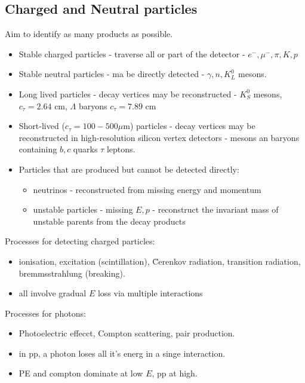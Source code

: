 \documentclass[]{article}
\begin{document}
	\subsection{Charged and Neutral particles}
	
		Aim to identify as many products as possible.
		
		\begin{itemize}
			\item Stable charged particles - traverse all or part of the detector - $e^-, \mu^-, \pi, K, p$
			\item Stable neutral particles - ma be directly detected - $\gamma, n, K^0_L$ mesons.
			\item Long lived particles - decay vertices may be reconstructed - $K^0_S$ mesons, $c_\tau=2.64$ cm, $\Lambda$ baryons $c_\tau=7.89$ cm
			\item Short-lived ($c_\tau=100-500\mu$m) particles - decay vertices may be reconstructed in high-resolution silicon vertex detectors - mesons an baryons containing $b, c$ quarks $\tau$ leptons.
			\item Particles that are produced but cannot be detected directly:
				\begin{itemize}
					\item neutrinos -  reconstructed from missing energy and momentum
					\item unstable particles - missing $E, p$ - reconstruct the invariant mass of unstable parents from the decay products
				\end{itemize}
		\end{itemize}
		
		Processes for detecting charged particles:
		\begin{itemize}
			\item ionisation, excitation (scintillation), \u{C}erenkov radiation, transition radiation, bremmsstrahlung (breaking).
			\item all involve gradual $E$ loss via multiple interactions
		\end{itemize}
		
		Processes for photons:
		\begin{itemize}
			\item Photoelectric effecct, Compton scattering, pair production.
			\item in pp, a photon loses all it's energ in a singe interaction.
			\item PE and compton dominate at low $E$, pp at high.
		\end{itemize}
		
\end{document}
